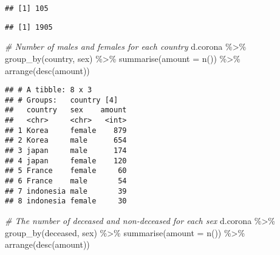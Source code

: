 \documentclass[
]{article}
\newenvironment{Shaded}{\begin{snugshade}}{\end{snugshade}}
\newcommand{\AttributeTok}[1]{\textcolor[rgb]{0.77,0.63,0.00}{#1}}
\newcommand{\CommentTok}[1]{\textcolor[rgb]{0.56,0.35,0.01}{\textit{#1}}}
\newcommand{\FunctionTok}[1]{\textcolor[rgb]{0.00,0.00,0.00}{#1}}
\newcommand{\NormalTok}[1]{#1}
\newcommand{\SpecialCharTok}[1]{\textcolor[rgb]{0.00,0.00,0.00}{#1}}
\newcommand{\StringTok}[1]{\textcolor[rgb]{0.31,0.60,0.02}{#1}}
\begin{document}
\begin{Shaded}
\end{Shaded}

\begin{verbatim}
## [1] 105
\end{verbatim}

\begin{Shaded}
\end{Shaded}

\begin{verbatim}
## [1] 1905
\end{verbatim}

\begin{Shaded}
\begin{Highlighting}[]
\CommentTok{\# Number of males and females for each country}
\NormalTok{d.corona }\SpecialCharTok{\%\textgreater{}\%}
  \FunctionTok{group\_by}\NormalTok{(country, sex) }\SpecialCharTok{\%\textgreater{}\%}
  \FunctionTok{summarise}\NormalTok{(}\AttributeTok{amount =} \FunctionTok{n}\NormalTok{()) }\SpecialCharTok{\%\textgreater{}\%}
  \FunctionTok{arrange}\NormalTok{(}\FunctionTok{desc}\NormalTok{(amount))}
\end{Highlighting}
\end{Shaded}

\begin{verbatim}
## # A tibble: 8 x 3
## # Groups:   country [4]
##   country   sex    amount
##   <chr>     <chr>   <int>
## 1 Korea     female    879
## 2 Korea     male      654
## 3 japan     male      174
## 4 japan     female    120
## 5 France    female     60
## 6 France    male       54
## 7 indonesia male       39
## 8 indonesia female     30
\end{verbatim}

\begin{Shaded}
\begin{Highlighting}[]
\CommentTok{\# The number of deceased and non{-}deceased for each sex}
\NormalTok{d.corona }\SpecialCharTok{\%\textgreater{}\%}
  \FunctionTok{group\_by}\NormalTok{(deceased, sex) }\SpecialCharTok{\%\textgreater{}\%}
  \FunctionTok{summarise}\NormalTok{(}\AttributeTok{amount =} \FunctionTok{n}\NormalTok{()) }\SpecialCharTok{\%\textgreater{}\%}
  \FunctionTok{arrange}\NormalTok{(}\FunctionTok{desc}\NormalTok{(amount)) }
\end{Highlighting}
\end{Shaded}
\end{document}
